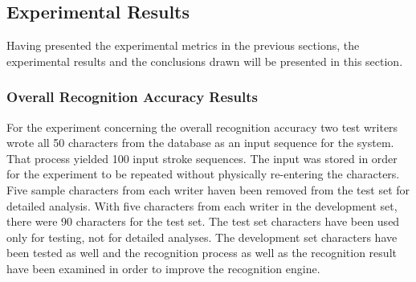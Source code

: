 \subsection{Experimental Results}
\label{sec:eval:experimentalresults}

Having presented the experimental metrics in the previous sections, 
the experimental results and the conclusions drawn will be presented in this 
section.

\subsubsection{Overall Recognition Accuracy Results}
\label{sec:eval:resultsoverallrecognition}

For the experiment concerning the overall recognition accuracy two test writers 
wrote all 50 characters from the database as an input sequence for the system.
That process yielded 100 input stroke sequences.
The input was stored in order for the experiment to be repeated without
physically re-entering the characters. Five sample characters from each 
writer haven been removed from the test set for detailed analysis.
With five characters from each writer in the development set, there were 
90 characters for the test set.
The test set characters have been used only for testing, not for 
detailed analyses. The development set characters have been tested as well
and the recognition process as well as the recognition result have been 
examined in order to improve the recognition engine.

